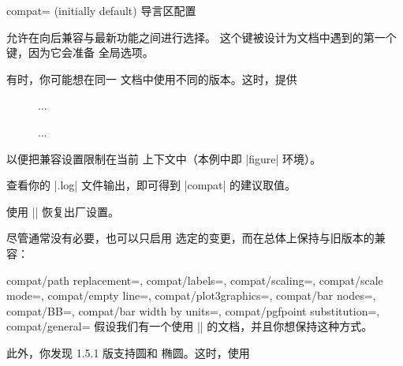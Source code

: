 \begin{pgfplotskey}{%
    compat= (initially default)}
    导言区配置

    允许在向后兼容与最新功能之间进行选择。
    这个键被设计为文档中遇到的第一个 \PGFPlots{} 键，因为它会准备
    全局选项。

    有时，你可能想在同一
    文档中使用不同的版本。这时，提供
\begin{codeexample}
\begin{figure}
    \pgfplotsset{compat=1.4}
    ...
    \caption{...}
\end{figure}
\end{codeexample}
    \noindent 以便把兼容设置限制在当前
    上下文中（本例中即 |figure| 环境）。

    查看你的 |.log| 文件输出，即可得到 |compat| 的建议取值。

    使用 |\pgfplotsset{compat=default}| 恢复出厂设置。

    尽管通常没有必要，也可以只启用
    选定的变更，而在总体上保持与旧版本的兼容：
    \begin{pgfplotskeylist}{%
        compat/path replacement=,
        compat/labels=,
        compat/scaling=,
        compat/scale mode=,
        compat/empty line=,
        compat/plot3graphics=,
        compat/bar nodes=,
        compat/BB=,
        compat/bar width by units=,
        compat/pgfpoint substitution=,
        compat/general=
    }
        假设我们有一个使用 |\pgfplotsset{compat=1.3}|
        的文档，并且你想保持这种方式。

        此外，你发现 1.5.1 版支持圆和
        椭圆。这时，使用
\begin{codeexample}[]
\pgfplotsset{
    compat=1.3,
    compat/path replacement=1.5.1,
}
\end{codeexample}


\end{pgfplotskeylist}
\end{pgfplotskey}
